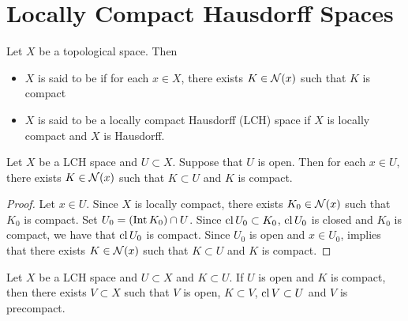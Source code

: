 \documentclass{book}
\begin{document}
 
 
 
 
 
 
 
 
 
 
 
 
 
 
 
 
 
 
 
 
 
 
 
 
 
 
 
 
 
 
 
 
 
 
 
 
 	\newpage
 \section{Locally Compact Hausdorff Spaces}
 
 \begin{defn}
 	Let $X$ be a topological space. Then 
 	\begin{itemize}
 		\item $X$ is said to be  if for each $x \in X$, there exists $K \in \mathcal{N}(x)$ such that $K$ is compact
 		\item $X$ is said to be a locally compact Hausdorff (LCH) space if $X$ is locally compact and $X$ is Hausdorff. 
 	\end{itemize} 
 \end{defn}

\begin{ex}
	Let $X$ be a LCH space and $U \subset X$. Suppose that $U$ is open. Then for each $x \in U$, there exists $K \in \mathcal{N}(x)$ such that $K \subset U$ and $K$ is compact.
\end{ex}

\begin{proof}
	Let $x \in U$. Since $X$ is locally compact, there exists $K_0 \in \mathcal{N}(x)$ such that $K_0$ is compact. Set $U_0 = (\operatorname{Int} K_0) \cap U$. Since $\operatorname{cl} U_0 \subset K_0$, $\operatorname{cl} U_0$ is closed and $K_0$ is compact, we have that $\operatorname{cl} U_0$ is compact. Since $U_0$ is open and $x \in U_0$,  implies that there exists $K \in \mathcal{N}(x)$ such that $K \subset U$ and $K$ is compact.
\end{proof}

\begin{ex}
	Let $X$ be a LCH space and $U \subset X$ and $K \subset U$. If $U$ is open and $K$ is compact, then there exists $V \subset X$ such that $V$ is open, $K \subset V$, $\operatorname{cl} V \subset U$ and $V$ is precompact. 
\end{ex}
\end{document}

